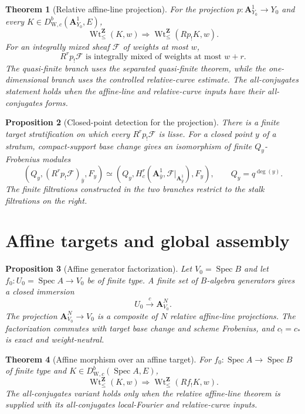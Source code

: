 \documentclass[10pt]{article}
\newtheorem{theorem}{Theorem}[section]
\newtheorem{proposition}[theorem]{Proposition}
\theoremstyle{definition}
\newcommand{\WeilD}{D^b_{\mathrm W,c}}
\newcommand{\IntWtLe}{\operatorname{Wt}^{\mathbf Z}_{\leq}}
\newcommand{\Spec}{\operatorname{Spec}}
\begin{document}
\begin{theorem}[Relative affine-line projection]
For the projection
\(p:\mathbf A^1_{Y_0}\to Y_0\) and every
\(K\in\WeilD(\mathbf A^1_{Y_0},E)\),
\[
               \IntWtLe(K,w)\Longrightarrow
               \IntWtLe(Rp_!K,w).
\]
For an integrally mixed sheaf \(\mathcal F\) of weights at most \(w\),
\[
 R^rp_!\mathcal F
 \text{ is integrally mixed of weights at most }w+r.
\]
The quasi-finite branch uses the separated quasi-finite theorem, while the
one-dimensional branch uses the controlled relative-curve estimate.  The
all-conjugates statement holds when the affine-line and relative-curve
inputs have their all-conjugates forms.
\end{theorem}

\begin{proposition}[Closed-point detection for the projection]
There is a finite target stratification on which every
\(R^rp_!\mathcal F\) is lisse.  For a closed point \(y\) of a stratum,
compact-support base change gives an isomorphism of finite
\(Q_y\)-Frobenius modules
\[
 (Q_y,(R^rp_!\mathcal F)_{\bar y},F_y)
 \simeq
 (Q_y,H_c^r(\mathbf A^1_{\bar y},
              \mathcal F|_{\mathbf A^1_{\bar y}}),F_y),
 \qquad Q_y=q^{\deg(y)}.
\]
The finite filtrations constructed in the two branches restrict to the
stalk filtrations on the right.
\end{proposition}

\section{Affine targets and global assembly}

\begin{proposition}[Affine generator factorization]
Let \(V_0=\Spec B\) and let \(f_0:U_0=\Spec A\to V_0\) be of finite type.
A finite set of \(B\)-algebra generators gives a closed immersion
\[
                 U_0\xrightarrow{c}\mathbf A^N_{V_0}.
\]
The projection \(\mathbf A^N_{V_0}\to V_0\) is a composite of \(N\)
relative affine-line projections.  The factorization commutes with target
base change and scheme Frobenius, and \(c_!=c_*\) is exact and
weight-neutral.
\end{proposition}

\begin{theorem}[Affine morphism over an affine target]
For \(f_0:\Spec A\to\Spec B\) of finite type and
\(K\in\WeilD(\Spec A,E)\),
\[
                 \IntWtLe(K,w)\Longrightarrow
                 \IntWtLe(Rf_!K,w).
\]
The all-conjugates variant holds only when the relative affine-line theorem
is supplied with its all-conjugates local-Fourier and relative-curve inputs.
\end{theorem}
\end{document}
